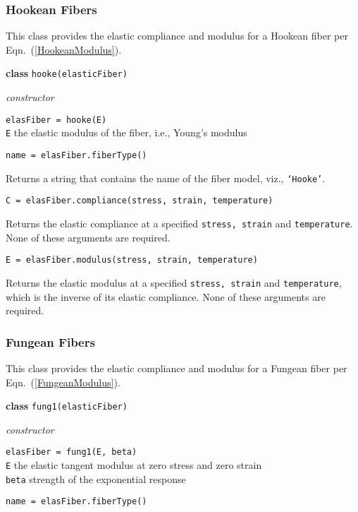 \subsubsection{Hookean Fibers}

This class provides the elastic compliance and modulus for a Hookean fiber per Eqn.~(\ref{HookeanModulus}).

\bigskip\noindent
\textbf{class} \texttt{hooke(elasticFiber)}

\medskip\noindent
\textit{constructor}

\medskip\noindent
\texttt{elasFiber = hooke(E)} \\
\indent \texttt{E} \;\; the elastic modulus of the fiber, i.e., Young's modulus

\bigskip\noindent
\texttt{name = elasFiber.fiberType()}

\medskip\noindent
Returns a string that contains the name of the fiber model, viz., \texttt{`Hooke'}.

\medskip\noindent
\texttt{C = elasFiber.compliance(stress, strain, temperature)}

\medskip\noindent
Returns the elastic compliance at a specified \texttt{stress, strain} and \texttt{temperature}.  None of these arguments are required.

\medskip\noindent
\texttt{E = elasFiber.modulus(stress, strain, temperature)}

\medskip\noindent
Returns the elastic modulus at a specified \texttt{stress, strain} and \texttt{temperature}, which is the inverse of its elastic compliance.  None of these arguments are required.


\subsubsection{Fungean Fibers}

This class provides the elastic compliance and modulus for a Fungean fiber per Eqn.~(\ref{FungeanModulus}).

\bigskip\noindent
\textbf{class} \texttt{fung1(elasticFiber)}

\medskip\noindent
\textit{constructor}

\medskip\noindent
\texttt{elasFiber = fung1(E, beta)} \\
\indent \texttt{E} \qquad the elastic tangent modulus at zero stress and zero strain \\
\indent \texttt{beta} \: strength of the exponential response

\bigskip\noindent
\texttt{name = elasFiber.fiberType()}

